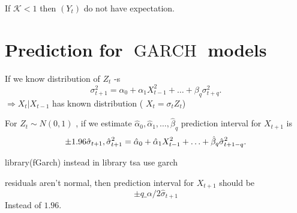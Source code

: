 \documentclass[12pt,a4paper, notitlepage]{book}
\theoremstyle{definition} %
\theoremstyle{plain} %
\DeclareMathOperator{\Garch}{GARCH}
\begin{document}
If $ \mathcal{K} < 1 $ then $ (Y_t) $ do not have expectation.

\section{ Prediction for $ \Garch $ models}

If we know distribution of $ Z_t $ -s
\[ \sigma_{t+1}^2 = \alpha_0 + \alpha_1 X_{t-1}^2 + \ldots + \beta_q \sigma_{t+q}^2 . \]
$ \Rightarrow X_t | X_{t-1} $ has known distribution ( $ X_t  = \sigma_t Z_t $)

For $ Z_t \sim N(0,1) $ , if we estimate $ \hat{\alpha}_0, \hat{\alpha}_1, \ldots, \hat{\beta}_q $ prediction interval
for $ X_{t+1} $ is\[ \pm 1.96 \hat{\sigma}_{t+1} , \\
\hat{\sigma}_{t+1}^2 = \hat{\alpha}_0 + \hat{\alpha}_1 X_{t-1}^2 + \ldots + \hat{\beta}_q \hat{\sigma}_{t+1-q}^2 . \]


library(fGarch)
instead in library tsa use garch

residuals aren't normal, then prediction interval for $ X_{t+1} $ should be 
\[ \pm q \_{\alpha/2} \hat{\sigma}_{t+1} \]
Instead of $ 1.96$.
\end{document}
